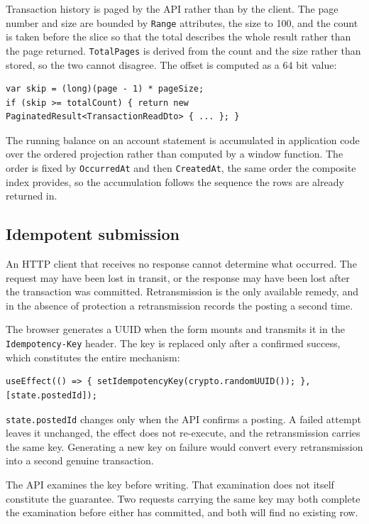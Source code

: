 \documentclass[11pt,a4paper]{article}
\newcommand{\code}[1]{\texttt{\fontsize{8.6}{10}\selectfont #1}}
\begin{document}
Transaction history is paged by the API rather than by the client. The page
number and size are bounded by \code{Range} attributes, the size to 100, and the
count is taken before the slice so that the total describes the whole result
rather than the page returned. \code{TotalPages} is derived from the count and
the size rather than stored, so the two cannot disagree. The offset is computed
as a 64 bit value:

\begin{lstlisting}
var skip = (long)(page - 1) * pageSize;
if (skip >= totalCount) { return new PaginatedResult<TransactionReadDto> { ... }; }
\end{lstlisting}


The running balance on an account statement is accumulated in application code
over the ordered projection rather than computed by a window function. The
order is fixed by \code{OccurredAt} and then \code{CreatedAt}, the same order
the composite index provides, so the accumulation follows the sequence the rows
are already returned in.

\subsection{Idempotent submission}\label{sec:idem}

An HTTP client that receives no response cannot determine what occurred. The
request may have been lost in transit, or the response may have been lost after
the transaction was committed. Retransmission is the only available remedy, and
in the absence of protection a retransmission records the posting a second
time.

The browser generates a UUID when the form mounts and transmits it in the
\code{Idempotency-Key} header. The key is replaced only after a confirmed
success, which constitutes the entire mechanism:

\begin{lstlisting}
useEffect(() => { setIdempotencyKey(crypto.randomUUID()); }, [state.postedId]);
\end{lstlisting}

\code{state.postedId} changes only when the API confirms a posting. A failed
attempt leaves it unchanged, the effect does not re-execute, and the
retransmission carries the same key. Generating a new key on failure would
convert every retransmission into a second genuine transaction.

The API examines the key before writing. That examination does not itself
constitute the guarantee. Two requests carrying the same key may both complete
the examination before either has committed, and both will find no existing
row.
\end{document}
